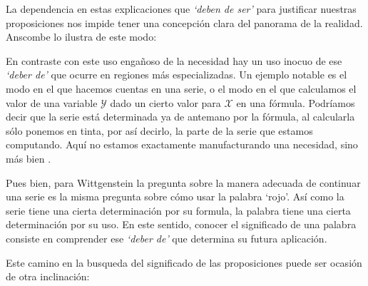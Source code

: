 La dependencia en estas explicaciones que \emph{`deben de ser'} para justificar
nuestras proposiciones nos impide tener una concepción clara del panorama de la
realidad. Anscombe lo ilustra de este modo:

En contraste con este uso engañoso de la necesidad hay un uso inocuo de ese
\emph{`deber de'} que ocurre en regiones más especializadas. Un ejemplo
notable es el modo en el que hacemos cuentas en una serie, o el modo en el que
calculamos el valor de una variable $\mathcal{Y}$ dado un cierto valor para
$\mathcal{X}$ en una fórmula. Podríamos decir que la serie está determinada ya
de antemano por la fórmula, al calcularla sólo ponemos en tinta, por así
decirlo, la parte de la serie que estamos computando. Aquí no estamos
exactamente manufacturando una necesidad, sino más bien
.

Pues bien, para Wittgenstein la pregunta sobre la manera adecuada de continuar
una serie es la misma pregunta sobre cómo usar la palabra `rojo'. Así como la
serie tiene una cierta determinación por su formula, la palabra tiene una cierta
determinación por su uso. En este sentido, conocer el significado de una palabra
consiste en comprender ese \emph{`deber de'} que determina su futura aplicación.

Este camino en la busqueda del significado de las proposiciones puede ser
ocasión de otra inclinación:

